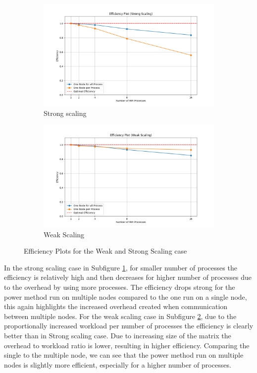 \begin{figure}[H]
    \centering
    \begin{subfigure}[b]{0.8\textwidth}
        \centering
	\includegraphics[width=\textwidth]{../media/efficiency_plot_eff_strong.png}
	\caption{Strong scaling}
	\label{fig:strong_eff}
    \end{subfigure}
    \hfill 
    \begin{subfigure}[b]{0.8\textwidth}
        \centering
\includegraphics[width=\textwidth]{../media/efficiency_plot_eff_weak.png}
	\caption{Weak Scaling}
	\label{fig:weak_eff}
    \end{subfigure}
    \caption{Efficiency Plots for the Weak and Strong Scaling case}
    \label{fig:eff}
\end{figure}

In the strong scaling case in Subfigure \ref{fig:strong_eff}, for smaller number of processes the efficiency is relatively high and then decreases for higher number of processes due to the overhead by using more processes. The efficiency drops strong for the power method run on multiple nodes compared to the one run on a single node, this again highlights the increased overhead created when communication between multiple nodes.\newline
\newline
For the weak scaling case in Subfigure \ref{fig:weak_eff}, due to the proportionally increased workload per number of processes the efficiency is clearly better than in Strong scaling case. Due to increasing size of the matrix the overhead to workload ratio is lower, resulting in higher efficiency. Comparing the single to the multiple node, we can see that the power method run on multiple nodes is slightly more efficient, especially for a higher number of processes.
